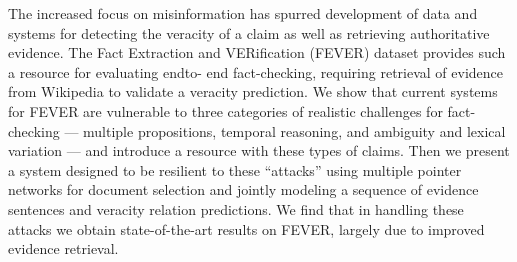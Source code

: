 The increased focus on misinformation has spurred development of data and systems for detecting the veracity of a claim as well as retrieving authoritative evidence. The Fact Extraction and VERification (FEVER) dataset provides such a resource for evaluating endto- end fact-checking, requiring retrieval of evidence from Wikipedia to validate a veracity prediction. We show that current systems for FEVER are vulnerable to three categories of realistic challenges for fact-checking --- multiple propositions, temporal reasoning, and ambiguity and lexical variation --- and introduce a resource with these types of claims. Then we present a system designed to be resilient to these ``attacks'' using multiple pointer networks for document selection and jointly modeling a sequence of evidence sentences and veracity relation predictions. We find that in handling these attacks we obtain state-of-the-art results on FEVER, largely due to improved evidence retrieval.
